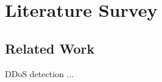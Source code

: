 \chapter{Literature Survey} 
\label{Literature:chap:chap2}
\graphicspath{{11.Chapter2/}}

\section{Related Work}

DDoS detection ...